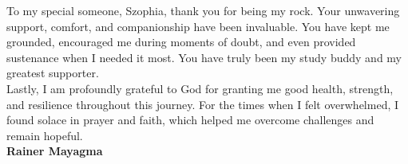 To my special someone, Szophia, thank you for being my rock. Your unwavering support, comfort, and companionship have been invaluable. You have kept me grounded, encouraged me during moments of doubt, and even provided sustenance when I needed it most. You have truly been my study buddy and my greatest supporter.\\

Lastly, I am profoundly grateful to God for granting me good health, strength, and resilience throughout this journey. For the times when I felt overwhelmed, I found solace in prayer and faith, which helped me overcome challenges and remain hopeful.
\\
\vspace{0.5em}
\hfill \textbf{Rainer Mayagma}